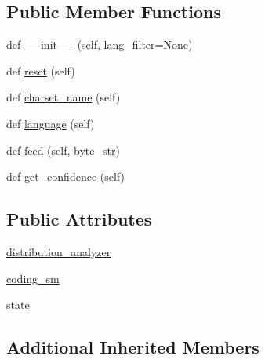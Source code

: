 \subsection*{Public Member Functions}
\begin{DoxyCompactItemize}
\item 
def \hyperlink{classpip_1_1__vendor_1_1chardet_1_1mbcharsetprober_1_1MultiByteCharSetProber_adea37e73e19177f9e173d5be2cb8fe87}{\+\_\+\+\_\+init\+\_\+\+\_\+} (self, \hyperlink{classpip_1_1__vendor_1_1chardet_1_1charsetprober_1_1CharSetProber_aa0806228646298c509357287bcda15da}{lang\+\_\+filter}=None)
\item 
def \hyperlink{classpip_1_1__vendor_1_1chardet_1_1mbcharsetprober_1_1MultiByteCharSetProber_a73b17ff997e8b3a1e22de3bc4af7c893}{reset} (self)
\item 
def \hyperlink{classpip_1_1__vendor_1_1chardet_1_1mbcharsetprober_1_1MultiByteCharSetProber_a9aed1ecb35496c5ce11560ce11c2f4a2}{charset\+\_\+name} (self)
\item 
def \hyperlink{classpip_1_1__vendor_1_1chardet_1_1mbcharsetprober_1_1MultiByteCharSetProber_aa1f7851ce3bf7ad59164bfa41285a3a4}{language} (self)
\item 
def \hyperlink{classpip_1_1__vendor_1_1chardet_1_1mbcharsetprober_1_1MultiByteCharSetProber_ad57b10650bc13b5edbb278b4488369e7}{feed} (self, byte\+\_\+str)
\item 
def \hyperlink{classpip_1_1__vendor_1_1chardet_1_1mbcharsetprober_1_1MultiByteCharSetProber_a135fc85727c9e5f4000ce30dfe57c538}{get\+\_\+confidence} (self)
\end{DoxyCompactItemize}
\subsection*{Public Attributes}
\begin{DoxyCompactItemize}
\item 
\hyperlink{classpip_1_1__vendor_1_1chardet_1_1mbcharsetprober_1_1MultiByteCharSetProber_a1434910ad05e9edee4d8f61db591a7c6}{distribution\+\_\+analyzer}
\item 
\hyperlink{classpip_1_1__vendor_1_1chardet_1_1mbcharsetprober_1_1MultiByteCharSetProber_a7ee0abe91a0195fbb0b5fd015a0dd47a}{coding\+\_\+sm}
\item 
\hyperlink{classpip_1_1__vendor_1_1chardet_1_1mbcharsetprober_1_1MultiByteCharSetProber_a8f89cdd4dfe4a96b546c56e1f5e81aaa}{state}
\end{DoxyCompactItemize}
\subsection*{Additional Inherited Members}


